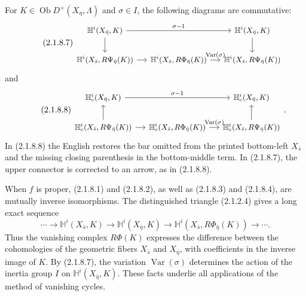 For $K\in\operatorname{Ob}D^+(X_\eta,\Lambda)$ and $\sigma\in I$,
the following diagrams are commutative:
\begin{equation}\tag{2.1.8.7}
\begin{tikzcd}[column sep=small, cells={nodes={font=\small}}]
\mathbb H^i(X_{\bar\eta},K)
  \arrow[rr, "\sigma-1"] \arrow[d]
  & {} & \mathbb H^i(X_{\bar\eta},K) \arrow[d] \\
\mathbb H^i(X_{\bar s},R\Psi_{\bar\eta}(K)) \arrow[r]
  & \mathbb H^i(X_{\bar s},R\Phi_{\bar\eta}(K))
      \arrow[r, "\operatorname{Var}(\sigma)"]
  & \mathbb H^i(X_{\bar s},R\Psi_{\bar\eta}(K))
\end{tikzcd}
\end{equation}
and
\begin{equation}\tag{2.1.8.8}
\begin{tikzcd}[column sep=small, cells={nodes={font=\small}}]
\mathbb H_c^i(X_{\bar\eta},K)
  \arrow[rr, "\sigma-1"]
  & {} & \mathbb H_c^i(X_{\bar\eta},K) \\
\mathbb H_c^i(X_{\bar s},R\Psi_{\bar\eta}(K)) \arrow[r] \arrow[u]
  & \mathbb H_c^i(X_{\bar s},R\Phi_{\bar\eta}(K))
      \arrow[r, "\operatorname{Var}(\sigma)"]
  & \mathbb H_c^i(X_{\bar s},R\Psi_{\bar\eta}(K)) \arrow[u]
\end{tikzcd}
.\end{equation}
In (2.1.8.8) the English restores the bar omitted from the printed
bottom-left $X_{\bar s}$ and the missing closing parenthesis in the
bottom-middle term.  In (2.1.8.7), the upper connector is corrected
to an arrow, as in (2.1.8.8).

When $f$ is proper, (2.1.8.1) and (2.1.8.2), as well as (2.1.8.3) and
(2.1.8.4), are mutually inverse isomorphisms.  The distinguished
triangle (2.1.2.4) gives a long exact sequence
\begin{equation}\tag{2.1.8.9}
\cdots\longrightarrow\mathbb H^i(X_{\bar s},K)
\longrightarrow\mathbb H^i(X_{\bar\eta},K)
\longrightarrow\mathbb H^i(X_{\bar s},R\Phi_{\bar\eta}(K))
\longrightarrow\cdots.
\end{equation}
Thus the vanishing complex $R\Phi(K)$ expresses the difference between
the cohomologies of the geometric fibers $X_{\bar s}$ and
$X_{\bar\eta}$, with coefficients in the inverse image of $K$.
By (2.1.8.7), the variation $\operatorname{Var}(\sigma)$ determines
the action of the inertia group $I$ on
$\mathbb H^i(X_{\bar\eta},K)$.  These facts underlie all applications
of the method of vanishing cycles.


